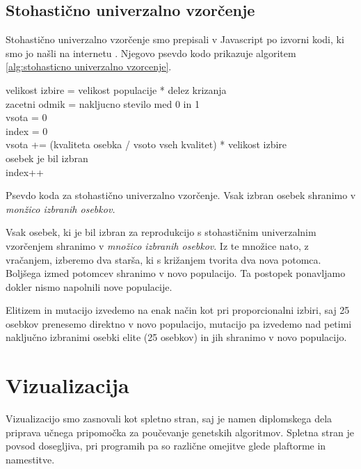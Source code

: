 \documentclass[a4paper, 12pt]{book}
\begin{document}
\subsection{Stohasti\v cno univerzalno vzor\v cenje}
Stohasti\v cno univerzalno vzor\v cenje smo prepisali v Javascript po izvorni kodi, ki smo jo na\v sli na internetu
\cite{github-stohasticno}. Njegovo psevdo kodo prikazuje algoritem \ref{alg:stohasticno univerzalno vzorcenje}.

\begin{algorithm}
\SetAlgoLined

velikost izbire = velikost populacije * delez krizanja\\
zacetni odmik = nakljucno stevilo med 0 in 1\\
vsota = 0\\
index = 0\\
{
	vsota += (kvaliteta osebka / vsoto vseh kvalitet) * velikost izbire\\
	{
		osebek je bil izbran\\
		index++
	}
}
\caption{Psevdo koda za stohasti\v cno univerzalno vzor\v cenje. Vsak izbran osebek shranimo v \textit{mon\v zico izbranih osebkov.}}
\label{alg:stohasticno univerzalno vzorcenje}
\end{algorithm}

Vsak osebek, ki je bil izbran za reprodukcijo s stohasti\v cnim univerzalnim vzor\v cenjem shranimo v \textit{mno\v zico izbranih osebkov}. Iz te mno\v zice nato, z vra\v canjem, izberemo dva star\v sa, ki s kri\v zanjem tvorita dva nova potomca. Bolj\v sega izmed potomcev shranimo v novo populacijo. Ta postopek ponavljamo dokler nismo napolnili nove populacije.

Elitizem in mutacijo izvedemo na enak na\v cin kot pri proporcionalni izbiri, saj 25 osebkov prenesemo direktno v novo populacijo, mutacijo pa izvedemo nad petimi naklju\v cno izbranimi osebki elite (25 osebkov) in jih shranimo v novo populacijo.
 
\section{Vizualizacija}
Vizualizacijo smo zasnovali kot spletno stran, saj je namen diplomskega dela priprava u\v cnega pripomo\v cka za pou\v cevanje genetskih algoritmov. Spletna stran je povsod dosegljiva, pri programih pa so razli\v cne omejitve glede plaftorme in namestitve. 
\end{document}
